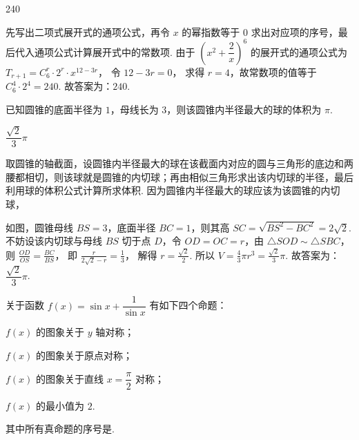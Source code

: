 \begin{answer}
240
\end{answer}

\begin{solution}
先写出二项式展开式的通项公式，再令 \(x\) 的幂指数等于 \(0\) 求出对应项的序号，最后代入通项公式计算展开式中的常数项.
由于 \(\left( x^2+\dfrac{2}{x} \right)^6\) 的展开式的通项公式为
\(T_{r+1}=C_6^r\cdot2^r\cdot x^{12-3r}\)，
令
\(12-3r=0\)，
求得 \(r=4\)，故常数项的值等于
\(C_6^4\cdot2^4=240\).
故答案为：\(240\).
\end{solution}

\begin{problem}
已知圆锥的底面半径为 \(1\)，母线长为 \(3\)，则该圆锥内半径最大的球的体积为\fillinblank{} \(\pi\).
\end{problem}

\begin{answer}
\(\dfrac{\sqrt{2}}{3}\pi\)
\end{answer}

\begin{solution}
取圆锥的轴截面，设圆锥内半径最大的球在该截面内对应的圆与三角形的底边和两腰都相切，则该球就是圆锥的内切球；再由相似三角形求出该内切球的半径，最后利用球的体积公式计算所求体积.
因为圆锥内半径最大的球应该为该圆锥的内切球，


如图，圆锥母线 \(BS=3\)，底面半径 \(BC=1\)，则其高
\(SC=\sqrt{BS^2-BC^2}=2\sqrt{2}\).
不妨设该内切球与母线 \(BS\) 切于点 \(D\)，令 \(OD=OC=r\)，由 \(\triangle SOD\sim\triangle SBC\)，则
\(\frac{OD}{OS}=\frac{BC}{BS}\)，
即
\(\frac{r}{2\sqrt{2}-r}=\frac{1}{3}\)，
解得
\(r=\frac{\sqrt{2}}{2}\).
所以
\(V=\frac{4}{3}\pi r^3=\frac{\sqrt{2}}{3}\pi\).
故答案为：\(\dfrac{\sqrt{2}}{3}\pi\).
\end{solution}

\begin{problem}
关于函数 \(f(x)=\sin x+\dfrac{1}{\sin x}\) 有如下四个命题：

\begin{circlelist}
\item \(f(x)\) 的图象关于 \(y\) 轴对称；
\item \(f(x)\) 的图象关于原点对称；
\item \(f(x)\) 的图象关于直线 \(x=\dfrac{\pi}{2}\) 对称；
\item \(f(x)\) 的最小值为 \(2\).
\end{circlelist}

其中所有真命题的序号是\fillinblank{}.
\end{problem}

